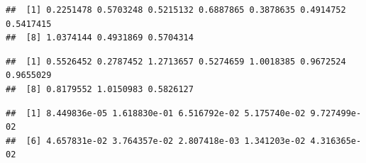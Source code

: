 \documentclass[
]{article}
\newenvironment{Shaded}{\begin{snugshade}}{\end{snugshade}}
\newcommand{\AttributeTok}[1]{\textcolor[rgb]{0.77,0.63,0.00}{#1}}
\newcommand{\DecValTok}[1]{\textcolor[rgb]{0.00,0.00,0.81}{#1}}
\newcommand{\FunctionTok}[1]{\textcolor[rgb]{0.00,0.00,0.00}{#1}}
\newcommand{\NormalTok}[1]{#1}
\newcommand{\SpecialCharTok}[1]{\textcolor[rgb]{0.00,0.00,0.00}{#1}}
\begin{document}
\begin{verbatim}
##  [1] 0.2251478 0.5703248 0.5215132 0.6887865 0.3878635 0.4914752 0.5417415
##  [8] 1.0374144 0.4931869 0.5704314
\end{verbatim}

\begin{Shaded}
\end{Shaded}

\begin{verbatim}
##  [1] 0.5526452 0.2787452 1.2713657 0.5274659 1.0018385 0.9672524 0.9655029
##  [8] 0.8179552 1.0150983 0.5826127
\end{verbatim}

\begin{Shaded}
\end{Shaded}

\begin{verbatim}
##  [1] 8.449836e-05 1.618830e-01 6.516792e-02 5.175740e-02 9.727499e-02
##  [6] 4.657831e-02 3.764357e-02 2.807418e-03 1.341203e-02 4.316365e-02
\end{verbatim}

\begin{Shaded}
\end{Shaded}
\end{document}
